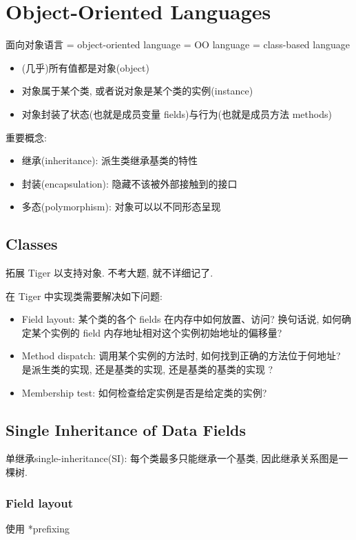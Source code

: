 \newpage
\section{Object-Oriented Languages} 
面向对象语言 = object-oriented language = OO language = class-based language
\begin{itemize}
    \item (几乎)所有值都是对象(object)
    \item 对象属于某个类, 或者说对象是某个类的实例(instance)
    \item 对象封装了状态(也就是成员变量 fields)与行为(也就是成员方法 methods)
\end{itemize}

重要概念:
\begin{itemize}
    \item 继承(inheritance): 派生类继承基类的特性
    \item 封装(encapsulation): 隐藏不该被外部接触到的接口
    \item 多态(polymorphism): 对象可以以不同形态呈现
\end{itemize}


\subsection{Classes}
拓展 Tiger 以支持对象. 不考大题, 就不详细记了. 


在 Tiger 中实现类需要解决如下问题:
\begin{itemize}
    \item Field layout: 某个类的各个 fields 在内存中如何放置、访问? 换句话说, 如何确定某个实例的 field 内存地址相对这个实例初始地址的偏移量? 
    \item Method dispatch: 调用某个实例的方法时, 如何找到正确的方法位于何地址? 是派生类的实现, 还是基类的实现, 还是基类的基类的实现 ? 
    \item Membership test: 如何检查给定实例是否是给定类的实例? 
\end{itemize}

\subsection{Single Inheritance of Data Fields}
单继承single-inheritance(SI): 每个类最多只能继承一个基类, 因此继承关系图是一棵树. 

\subsubsection{Field layout}
使用 *prefixing

